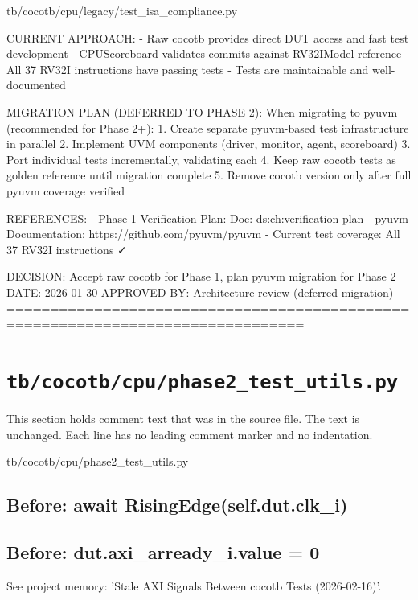 \begin{relocated}{tb/cocotb/cpu/legacy/test_isa_compliance.py}
\begin{textblock}
CURRENT APPROACH:
- Raw cocotb provides direct DUT access and fast test development
- CPUScoreboard validates commits against RV32IModel reference
- All 37 RV32I instructions have passing tests
- Tests are maintainable and well-documented

MIGRATION PLAN (DEFERRED TO PHASE 2):
When migrating to pyuvm (recommended for Phase 2+):
1. Create separate pyuvm-based test infrastructure in parallel
2. Implement UVM components (driver, monitor, agent, scoreboard)
3. Port individual tests incrementally, validating each
4. Keep raw cocotb tests as golden reference until migration complete
5. Remove cocotb version only after full pyuvm coverage verified

REFERENCES:
- Phase 1 Verification Plan: Doc: ds:ch:verification-plan
- pyuvm Documentation: https://github.com/pyuvm/pyuvm
- Current test coverage: All 37 RV32I instructions ✓

DECISION: Accept raw cocotb for Phase 1, plan pyuvm migration for Phase 2
DATE: 2026-01-30
APPROVED BY: Architecture review (deferred migration)
================================================================================
\end{textblock}

\end{relocated}

\section{\texttt{tb/cocotb/cpu/phase2\_test\_utils.py}}\label{tm:suite:cpu-phase2-test-utils}

This section holds comment text that was in the source file. The text is unchanged. Each line has no leading comment marker and no indentation.

\begin{relocated}{tb/cocotb/cpu/phase2_test_utils.py}

\subsection*{Before: await RisingEdge(self.dut.clk\_i)}


\subsection*{Before: dut.axi\_arready\_i.value = 0}

\begin{textblock}
See project memory: 'Stale AXI Signals Between cocotb Tests (2026-02-16)'.
\end{textblock}

\end{relocated}

